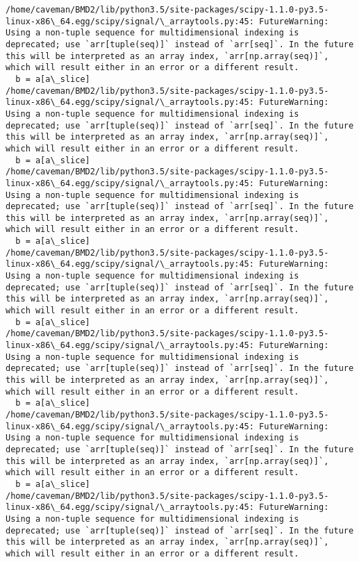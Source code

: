 \documentclass[11pt]{article}
\begin{document}
    \begin{Verbatim}[commandchars=\\\{\}]
/home/caveman/BMD2/lib/python3.5/site-packages/scipy-1.1.0-py3.5-linux-x86\_64.egg/scipy/signal/\_arraytools.py:45: FutureWarning: Using a non-tuple sequence for multidimensional indexing is deprecated; use `arr[tuple(seq)]` instead of `arr[seq]`. In the future this will be interpreted as an array index, `arr[np.array(seq)]`, which will result either in an error or a different result.
  b = a[a\_slice]
/home/caveman/BMD2/lib/python3.5/site-packages/scipy-1.1.0-py3.5-linux-x86\_64.egg/scipy/signal/\_arraytools.py:45: FutureWarning: Using a non-tuple sequence for multidimensional indexing is deprecated; use `arr[tuple(seq)]` instead of `arr[seq]`. In the future this will be interpreted as an array index, `arr[np.array(seq)]`, which will result either in an error or a different result.
  b = a[a\_slice]
/home/caveman/BMD2/lib/python3.5/site-packages/scipy-1.1.0-py3.5-linux-x86\_64.egg/scipy/signal/\_arraytools.py:45: FutureWarning: Using a non-tuple sequence for multidimensional indexing is deprecated; use `arr[tuple(seq)]` instead of `arr[seq]`. In the future this will be interpreted as an array index, `arr[np.array(seq)]`, which will result either in an error or a different result.
  b = a[a\_slice]
/home/caveman/BMD2/lib/python3.5/site-packages/scipy-1.1.0-py3.5-linux-x86\_64.egg/scipy/signal/\_arraytools.py:45: FutureWarning: Using a non-tuple sequence for multidimensional indexing is deprecated; use `arr[tuple(seq)]` instead of `arr[seq]`. In the future this will be interpreted as an array index, `arr[np.array(seq)]`, which will result either in an error or a different result.
  b = a[a\_slice]
/home/caveman/BMD2/lib/python3.5/site-packages/scipy-1.1.0-py3.5-linux-x86\_64.egg/scipy/signal/\_arraytools.py:45: FutureWarning: Using a non-tuple sequence for multidimensional indexing is deprecated; use `arr[tuple(seq)]` instead of `arr[seq]`. In the future this will be interpreted as an array index, `arr[np.array(seq)]`, which will result either in an error or a different result.
  b = a[a\_slice]
/home/caveman/BMD2/lib/python3.5/site-packages/scipy-1.1.0-py3.5-linux-x86\_64.egg/scipy/signal/\_arraytools.py:45: FutureWarning: Using a non-tuple sequence for multidimensional indexing is deprecated; use `arr[tuple(seq)]` instead of `arr[seq]`. In the future this will be interpreted as an array index, `arr[np.array(seq)]`, which will result either in an error or a different result.
  b = a[a\_slice]
/home/caveman/BMD2/lib/python3.5/site-packages/scipy-1.1.0-py3.5-linux-x86\_64.egg/scipy/signal/\_arraytools.py:45: FutureWarning: Using a non-tuple sequence for multidimensional indexing is deprecated; use `arr[tuple(seq)]` instead of `arr[seq]`. In the future this will be interpreted as an array index, `arr[np.array(seq)]`, which will result either in an error or a different result.

\end{Verbatim}
\end{document}
